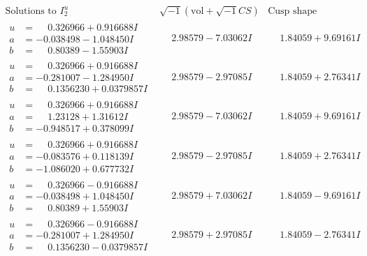 \documentclass[1p]{elsarticle_modified}
\theoremstyle{definition}
\newcommand{\I}{\sqrt{-1}}
\begin{document}
$$\begin{array}{c|c|c}  
\text{Solutions to }I^u_{2}& \I (\text{vol} + \sqrt{-1}CS) & \text{Cusp shape}\\
 \hline 
\begin{aligned}
u &= \phantom{-}0.326966 + 0.916688 I \\
a &= -0.038498 - 1.048450 I \\
b &= \phantom{-}0.80389 - 1.55903 I\end{aligned}
 & \phantom{-}2.98579 - 7.03062 I & \phantom{-}1.84059 + 9.69161 I \\ \hline\begin{aligned}
u &= \phantom{-}0.326966 + 0.916688 I \\
a &= -0.281007 - 1.284950 I \\
b &= \phantom{-}0.1356230 + 0.0379857 I\end{aligned}
 & \phantom{-}2.98579 - 2.97085 I & \phantom{-}1.84059 + 2.76341 I \\ \hline\begin{aligned}
u &= \phantom{-}0.326966 + 0.916688 I \\
a &= \phantom{-}1.23128 + 1.31612 I \\
b &= -0.948517 + 0.378099 I\end{aligned}
 & \phantom{-}2.98579 - 7.03062 I & \phantom{-}1.84059 + 9.69161 I \\ \hline\begin{aligned}
u &= \phantom{-}0.326966 + 0.916688 I \\
a &= -0.083576 + 0.118139 I \\
b &= -1.086020 + 0.677732 I\end{aligned}
 & \phantom{-}2.98579 - 2.97085 I & \phantom{-}1.84059 + 2.76341 I \\ \hline\begin{aligned}
u &= \phantom{-}0.326966 - 0.916688 I \\
a &= -0.038498 + 1.048450 I \\
b &= \phantom{-}0.80389 + 1.55903 I\end{aligned}
 & \phantom{-}2.98579 + 7.03062 I & \phantom{-}1.84059 - 9.69161 I \\ \hline\begin{aligned}
u &= \phantom{-}0.326966 - 0.916688 I \\
a &= -0.281007 + 1.284950 I \\
b &= \phantom{-}0.1356230 - 0.0379857 I\end{aligned}
 & \phantom{-}2.98579 + 2.97085 I & \phantom{-}1.84059 - 2.76341 I \\ \hline\begin{aligned}

\end{aligned}
\end{array}$$
\end{document}
